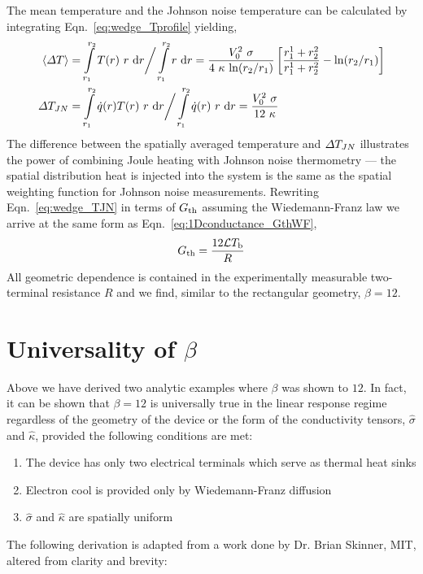 The mean temperature and the Johnson noise temperature can be calculated by integrating Eqn.~\ref{eq:wedge_Tprofile} yielding,
\begin{align}
\langle\Delta T\rangle &= \int\limits_{r_1}^{r_2}T(r)~r~\mathrm{d}r \bigg/ \int\limits_{r_1}^{r_2}r~\mathrm{d}r =\frac{V_0^2~\sigma}{4~\kappa~\mathrm{ln}(r_2/r_1)}\left[\frac{r_1^1+r_2^2}{r_1^1+r_2^2}-\mathrm{ln}(r_2/r_1)\right] \\
\Delta T_{JN} &= \int\limits_{r_1}^{r_2}\dot{q}(r)T(r)~r~\mathrm{d}r \bigg/ \int\limits_{r_1}^{r_2}\dot{q}(r)~r~\mathrm{d}r = \frac{V_0^2~\sigma}{12~\kappa}\label{eq:wedge_TJN}
\end{align}
The difference between the spatially averaged temperature and $\Delta T_{JN}$ illustrates the power of combining Joule heating with Johnson noise thermometry --- the spatial distribution heat is injected into the system is the same as the spatial weighting function for Johnson noise measurements. Rewriting Eqn.~\ref{eq:wedge_TJN} in terms of $G_{\mathrm{th}}$ assuming the Wiedemann-Franz law we arrive at the same form as Eqn.~\ref{eq:1Dconductance_GthWF},
\begin{equation}\label{eq:wedge_GthWF}
G_{\mathrm{th}} = \frac{12\mathcal{L} T_\mathrm{b}}{R}
\end{equation}
All geometric dependence is contained in the experimentally measurable two-terminal resistance $R$ and we find, similar to the rectangular geometry, $\beta = 12$.

\section{Universality of $\beta$}
\label{section:beta}
Above we have derived two analytic examples where $\beta$ was shown to $12$. In fact, it can be shown that $\beta = 12$ is universally true in the linear response regime regardless of the geometry of the device or the form of the conductivity tensors, $\hat\sigma$ and $\hat\kappa$, provided the following conditions are met:
\begin{enumerate}
\item The device has only two electrical terminals which serve as thermal heat sinks
\item Electron cool is provided only by Wiedemann-Franz diffusion
\item $\hat\sigma$ and $\hat\kappa$ are spatially uniform
\end{enumerate}
The following derivation is adapted from a work done by Dr. Brian Skinner, MIT, altered from clarity and brevity:

